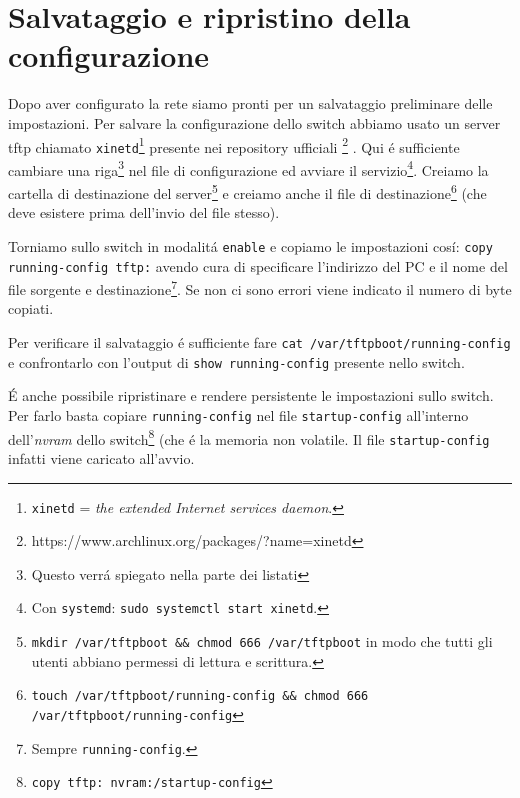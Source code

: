 \documentclass[9pt, a4paper, oneside]{article}
\begin{document}
 		\section{Salvataggio e ripristino della configurazione}
			\par
				Dopo aver configurato la rete siamo pronti per 
				un salvataggio preliminare delle impostazioni. 
				Per salvare la configurazione dello switch 
				abbiamo usato un server tftp chiamato 
				\texttt{xinetd}\footnote{\texttt{xinetd} = 
				\emph{the extended Internet services daemon}.} 
				presente nei repository ufficiali
				\footnote{https://www.archlinux.org/packages/?name=xinetd}
				. Qui \'e sufficiente cambiare una 
				riga\footnote{Questo verr\'a 
				spiegato nella parte dei listati} nel file di 
				configurazione ed avviare il 
				servizio\footnote{Con \texttt{systemd}: 
				\texttt{sudo systemctl start xinetd}.}. Creiamo 
				la cartella di destinazione del 
				server\footnote{\texttt{mkdir /var/tftpboot 
				\&\& chmod 666 /var/tftpboot} in modo che tutti 
				gli utenti abbiano permessi di lettura e 
				scrittura.} e creiamo anche il file di 
				destinazione\footnote{\texttt{touch 
				/var/tftpboot/running-config \&\& chmod 666 
				/var/tftpboot/running-config}} (che deve 
				esistere prima dell'invio del file stesso).
			\par
				Torniamo sullo switch in modalit\'a 
				\texttt{enable} e copiamo le impostazioni 
				cos\'i: \texttt{copy running-config tftp:} 
				avendo cura di specificare l'indirizzo del PC e 
				il nome del file sorgente e 
				destinazione\footnote{Sempre 
				\texttt{running-config}.}. Se non ci sono 
				errori viene indicato il numero di byte 
				copiati.
			\par
				Per verificare il salvataggio \'e sufficiente 
				fare \texttt{cat /var/tftpboot/running-config} 
				e confrontarlo con l'output di \texttt{show 
				running-config} presente nello switch.
			\par
				\'E anche possibile ripristinare e rendere 
				persistente le impostazioni sullo switch. Per 
				farlo basta copiare \texttt{running-config} nel 
				file \texttt{startup-config} all'interno 
				dell'\emph{nvram} dello switch\footnote{
				\texttt{copy tftp: nvram:/startup-config}} (che 
				\'e la memoria non volatile. Il file 
				\texttt{startup-config} infatti viene caricato 
				all'avvio.
\end{document}
